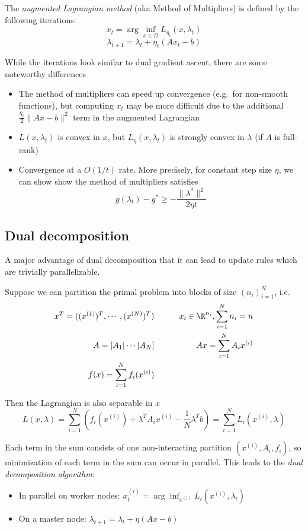 The \emph{augmented Lagrangian method} (aka Method of Multipliers) is
defined by the following iterations:
\[
x_t = \arg\inf_{x \in \Omega} L_{\eta_t} (x, \lambda_t)
\]
\[
\lambda_{t+1} = \lambda_t + \eta_t (A x_t - b)
\]

While the iterations look similar to dual gradient ascent, there are
some noteworthy differences
\begin{itemize}
\item The method of multipliers can speed up
convergence (e.g.~for non-smooth functions), but computing $x_t$ may
be more difficult due to the additional
$\frac{\eta_t}{2} \|A x - b\|^2$ term in the augmented Lagrangian
\item $L(x, \lambda_t)$ is convex in $x$, but $L_\eta(x, \lambda_t)$ is
strongly convex in $\lambda$ (if $A$ is full-rank)
\item Convergence at
a $O(1/t)$ rate. More precisely, for constant step size $\eta$, we
can show show the method of multipliers satisfies
\[g(\lambda_t) - g^* \geq -\frac{\|\lambda^*\|^2}{2\eta t}\]
\end{itemize}

\subsection{Dual decomposition}

A major advantage of dual decomposition that it can lead to update rules
which are trivially parallelizable.

Suppose we can partition the primal problem into blocks of size
$(n_i)_{i=1}^N$, i.e.
\begin{align}
x ^T = ((x^{(1)})^T, \cdots, (x^{(N)})^T) &\qquad& x_i \in \R^{n_i}, \sum_{i=1}^N n_i = n \\
A = [A_1 \vert \cdots \vert A_N] &\qquad& A x = \sum_{i=1}^N A_i x^{(i)} \\
f(x) = \sum_{i=1}^N f_i(x^{(i)})
\end{align}

Then the Lagrangian is also separable in $x$
\[
L(x, \lambda) = \sum_{i=1}^N \left( f_i(x^{(i)}) + \lambda^T A_i x^{(i)} - \frac{1}{N} \lambda^T b\right) = \sum_{i=1}^N L_i(x^{(i)}, \lambda)
\]

Each term in the sum consists of one non-interacting partition
$(x^{(i)}, A_i, f_i)$, so minimization of each term in the sum can
occur in parallel. This leads to the \emph{dual decomposition
algorithm}:

\begin{itemize}
\item
  In parallel on worker nodes:
  $x_t^{(i)} = \arg\inf_{x^{(i)}} L_i(x^{(i)}, \lambda_t)$
\item
  On a master node: $\lambda_{t+1} = \lambda_t + \eta (A x - b)$
\end{itemize}

